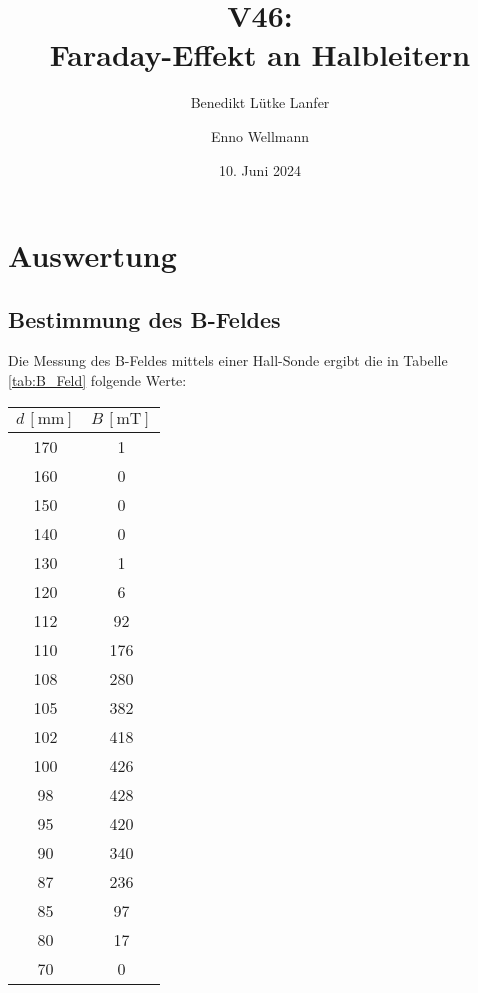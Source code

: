 

\title{V46:\\ Faraday-Effekt an Halbleitern}
\author{Benedikt Lütke Lanfer \and Enno Wellmann}
\date{10. Juni 2024}
\publishers{TU Dortmund – Fakultät Physik}



\tableofcontents
\newpage







\newpage
\section{Auswertung}
\subsection{Bestimmung des B-Feldes}
Die Messung des B-Feldes mittels einer Hall-Sonde ergibt die in Tabelle \eqref{tab:B_Feld} folgende Werte:

\begin{table}[H]
	\centering
	\begin{tabular}{c c}
		\toprule
		$d \, [\unit{\milli\meter}]$ & $B \, [\unit{\milli\tesla}] $  \\
		\midrule
        170 & 1 \\
        160 & 0 \\
        150 & 0 \\
        140 & 0 \\
        130 & 1 \\
        120 & 6 \\
        112 & 92 \\
        110 & 176 \\
        108 & 280 \\
        105 & 382 \\
        102 & 418 \\
        100 & 426 \\
        98  & 428 \\
        95  & 420 \\
        90  & 340 \\
        87  & 236 \\
        85  & 97 \\
        80  & 17 \\
        70  & 0  \\
		\bottomrule
	\end{tabular}
    \label{tab:B_Feld}
\end{table}


